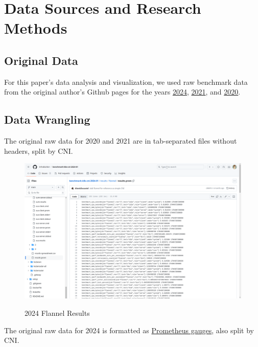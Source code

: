 %
%

\pagebreak
\section{Data Sources and Research Methods}

\onehalfspacing

\subsection{Original Data}

For this paper's data analysis and visualization, we used raw benchmark data from the original author's Github pages for the years \href{https://github.com/InfraBuilder/benchmark-k8s-cni-2024-01}{2024}, \href{https://github.com/InfraBuilder/benchmark-k8s-cni-2021-05}{2021}, and \href{https://github.com/InfraBuilder/benchmark-k8s-cni-2020-08}{2020}.

\subsection{Data Wrangling}

The original raw data for 2020 and 2021 are in tab-separated files without headers, split by CNI.

\begin{figure}[H]
\centering
\caption {2024 Flannel Results}
\includegraphics[width=\linewidth]{images/flannel-prom.png}
\label{fig:flannel-prom}
\end{figure}

The original raw data for 2024 is formatted as \href{https://prometheus.io/docs/concepts/metric_types/#gauge}{Prometheus gauges}, also split by CNI.

